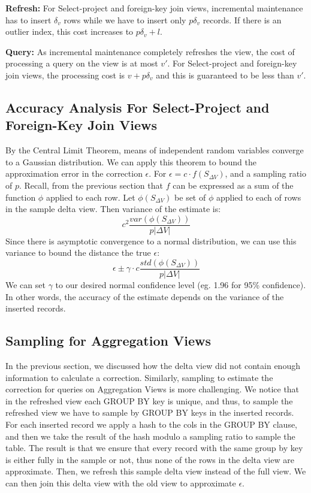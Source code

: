\textbf{Refresh: } For Select-project and foreign-key join views, incremental maintenance has to insert $\delta_v$ rows while we have to insert only $p\delta_v$ records. If there is an outlier index, this cost increases to $p\delta_v + l$. 

\textbf{Query: } As incremental maintenance completely refreshes the view, the cost of processing a query on the view is at most $v'$. For Select-project and foreign-key join views, the processing cost is $v + p\delta_v$ and this is guaranteed to be less than $v'$. 

\subsection{Accuracy Analysis For Select-Project and Foreign-Key Join Views}
By the Central Limit Theorem, means of independent random variables converge 
to a Gaussian distribution.
We can apply this theorem to bound the approximation error in the correction $\epsilon$.
For $\epsilon = c\cdot f(S_{\Delta V})$, and a sampling ratio of $p$.
Recall, from the previous section that $f$ can be expressed as a sum of the function $\phi$ applied to each row.
Let $\phi(S_{\Delta V})$ be set of $\phi$ applied to each of rows in the sample delta view.
Then variance of the estimate is:
\[
c^2\frac{var(\phi(S_{\Delta V}))}{p|\Delta V|}
\] 
Since there is asymptotic convergence to a normal distribution, we can use this variance to bound the distance the true $\epsilon$:   
\[
\epsilon \pm \gamma \cdot c\frac{std(\phi(S_{\Delta V}))}{p|\Delta V|}
\]
We can set $\gamma$ to our desired normal confidence level (eg. 1.96 for 95\% confidence).
In other words, the accuracy of the estimate depends on the variance of the inserted records.

\subsection{Sampling for Aggregation Views}
In the previous section, we discussed how the delta view did not contain enough
information to calculate a correction.
Similarly, sampling to estimate the correction for queries on Aggregation Views
is more challenging.
We notice that in the refreshed view each GROUP BY key is unique, and
thus, to sample the refreshed view we have to sample by GROUP BY keys
in the inserted records. For each inserted record we apply a hash
to the cols in the GROUP BY clause, and then we take the result of
the hash modulo a sampling ratio to sample the table. The result is
that we ensure that every record with the same group by key is either
fully in the sample or not, thus none of the rows in the delta view
are approximate. 
Then, we refresh this sample delta view instead of the full view.
We can then join this delta view with the old view to approximate $\epsilon$.

